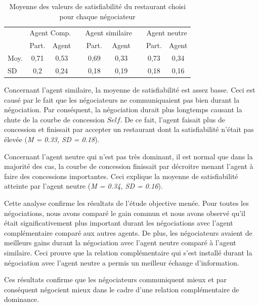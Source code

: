 	
	\begin{table}
		\centering
		\caption{Moyenne des valeurs de satisfiabilité du restaurant choisi pour chaque négociateur} 
		\begin{tabular} {lcccccccc}
			\hline
			\hline
			& \multicolumn{2}{c}{Agent Comp.} & & \multicolumn{2}{c}{Agent similaire}& & \multicolumn{2}{c}{Agent neutre} \\ %
			\cline{2-3} \cline{5-6} \cline{8-9} %
			& Part. & Agent & & Part. & Agent & &  Part. &Agent \\ \hline
			Moy. &0,71 & 0,53 & &  0,69 & 0,33 & & 0,73 & 0,34 \\
			SD & 0,2 & 0,24 & &  0,18 & 0,19 & & 0,18 & 0,16 \\
			\hline
			\hline
		\end{tabular}
		\label{tab:gainPerceptif}
		
	\end{table}
	
	Concernant l'agent similaire, la moyenne de satisfiabilité est assez basse. Ceci est causé par le fait que les négociateurs ne communiquaient pas bien durant la négociation. Par conséquent, la négociation durait plus longtemps causant la chute de la courbe de concession $Self$. De ce fait, l'agent faisait plus de concession et finissait par accepter un restaurant dont la satisfiabilité n'était pas élevée (\emph{M = 0.33, SD = 0.18}).
	
	Concernant l'agent neutre qui n'est pas très dominant, il est normal que dans la majorité des cas, la courbe de concession finissait par décroitre menant l'agent à faire des concessions importantes. Ceci explique la moyenne de satisfiabilité atteinte par l'agent neutre  (\emph{M = 0.34, SD = 0.16}).
	
	Cette analyse confirme les résultats de l'étude objective menée.
	Pour toutes les négociations, nous avons comparé le gain commun et nous avons observé qu'il était significativement plus important durant les négociations avec l'agent complémentaire comparé aux autres agents. De plus, les négociateurs avaient de meilleurs gains durant la négociation avec l'agent neutre comparé à l'agent similaire. Ceci prouve que la relation complémentaire qui s'est installé durant la négociation avec l'agent neutre a permis un meilleur échange d'information. 
	
	Ces résultats confirme que les négociateurs communiquent mieux et par conséquent négocient mieux dans le cadre d'une relation complémentaire de dominance.  
	
